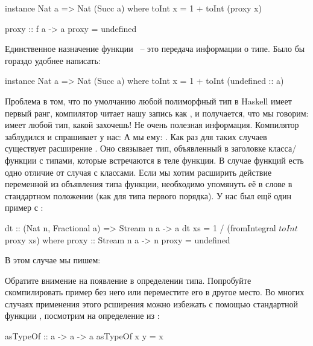 \begin{code}
instance Nat a => Nat (Succ a) where
    toInt x = 1 + toInt (proxy x)
        
proxy :: f a -> a
proxy = undefined
\end{code}

Единственное назначение функции ~-- это
передача информации о типе. Было бы гораздо удобнее
написать:


\begin{code}
instance Nat a => Nat (Succ a) where
    toInt x = 1 + toInt (undefined :: a)
\end{code}

Проблема в том, что по умолчанию любой полиморфный тип 
в Haskell имеет первый ранг, компилятор читает 
нашу запись как , и получается,
что мы говорим:  имеет любой тип, какой захочешь!
Не очень полезная информация. Компилятор заблудился
и спрашивает у нас:  
А мы ему: . Как раз для таких
случаев существует расширение .
Оно связывает тип, объявленный в заголовке класса/функции
с типами, которые встречаются в теле функции.  
В случае функций есть одно отличие от случая с классами.
Если мы хотим расширить действие переменной из объявления
типа функции, необходимо упомянуть её в слове 
в стандартном положении (как для типа первого порядка).
У нас был ещё один пример с :

\begin{code}
dt :: (Nat n, Fractional a) => Stream n a -> a
dt xs = 1 / (fromIntegral $ toInt $ proxy xs)
    where proxy :: Stream n a -> n
          proxy = undefined
\end{code}

В этом случае мы пишем: 


Обратите внимение на появление  в определении
типа. Попробуйте скомпилировать пример без него или
переместите его в другое место. 
Во многих случаях применения этого рсширения можно избежать
с помощью стандартной функции , посмотрим на
определение из :

\begin{code}
asTypeOf :: a -> a -> a
asTypeOf x y = x
\end{code}

